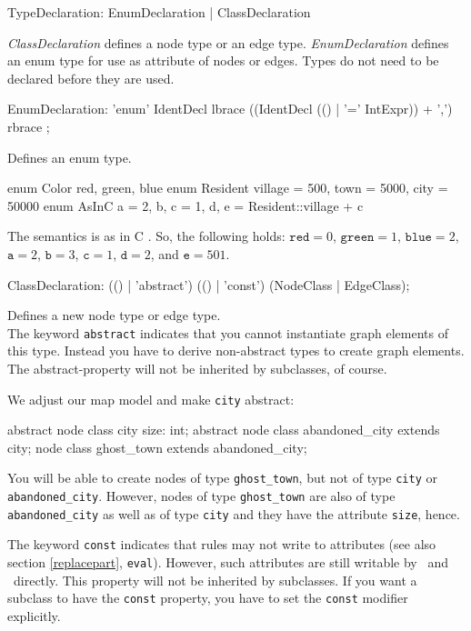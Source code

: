 \begin{rail}
  TypeDeclaration: EnumDeclaration | ClassDeclaration
\end{rail}
\emph{ClassDeclaration} defines a node type or an edge type. \emph{EnumDeclaration} defines an enum type for use as attribute of nodes or edges. Types do not need to be declared before they are used.

\begin{rail}
  EnumDeclaration: 'enum' IdentDecl lbrace ((IdentDecl (() | '=' IntExpr)) + ',') rbrace ;
\end{rail}
Defines an enum type.

\begin{example}
\begin{grgen}
enum Color {red, green, blue}
enum Resident {village = 500, town = 5000, city = 50000}
enum AsInC {a = 2, b, c = 1, d, e = Resident::village + c}
\end{grgen}
The semantics is as in C \cite{isoc}. So, the following holds: $\texttt{red} = 0$, $\texttt{green} = 1$, $\texttt{blue} = 2$, $\texttt{a}=2$, $\texttt{b}=3$, $\texttt{c}=1$, $\texttt{d}=2$, and $\texttt{e}=501$.
\end{example}

\begin{rail}  
  ClassDeclaration: (() | 'abstract') (() | 'const') (NodeClass | EdgeClass);
\end{rail}
Defines a new node type or edge type.\\
The keyword \texttt{abstract} indicates that you cannot instantiate graph elements of this type. Instead you have to derive non-abstract types to create graph elements. The abstract-property will not be inherited by subclasses, of course.

\begin{example}
We adjust our map model and make \texttt{city} abstract:
\begin{grgen}
abstract node class city {
	size: int;
}
abstract node class abandoned_city extends city;
node class ghost_town extends abandoned_city;
\end{grgen}
You will be able to create nodes of type \texttt{ghost\_town}, but not of type \texttt{city} or \texttt{abandoned\_city}. However, nodes of type \texttt{ghost\_town} are also of type \texttt{abandoned\_city} as well as of type \texttt{city} and they have the attribute \texttt{size}, hence.
\end{example}
The keyword \texttt{const} indicates that rules may not write to attributes (see also section \ref{replacepart}, \texttt{eval}). However, such attributes are still writable by \LibGr\ and \GrShell\ directly. This property will not be inherited by subclasses. If you want a subclass to have the \texttt{const} property, you have to set the \texttt{const} modifier explicitly.

